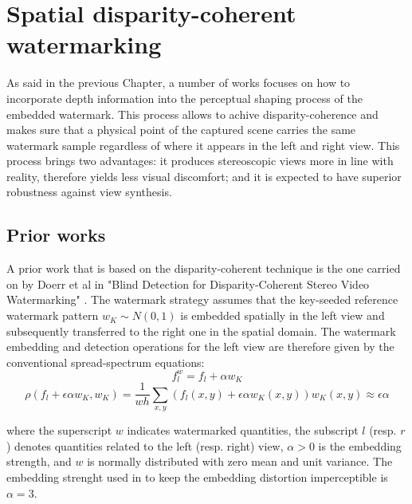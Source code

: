 \chapter{Spatial disparity-coherent watermarking}
\label{spa}



As said in the previous Chapter, a number of works focuses on how to incorporate depth information into the perceptual shaping process of the embedded watermark.\newline 
This process allows to achive disparity-coherence and makes sure that a physical point of the captured scene carries the same watermark sample regardless of where it appears in the left and right view.\newline
This process brings two advantages: it produces stereoscopic views more in line with reality, therefore yields less visual discomfort; and it is expected to have superior robustness against view synthesis.\newline

\section{Prior works} 

A prior work that is based on the disparity-coherent technique is the one carried on by Doerr et al in "Blind Detection for Disparity-Coherent
Stereo Video Watermarking" \cite{DOER2}.\newline
The watermark strategy  assumes that the key-seeded reference watermark pattern $w_{K} \sim N(0, 1)$ is embedded spatially in the left view and subsequently transferred to the right one in the spatial domain.\newline
The watermark embedding and detection operations for the left view are therefore given by the conventional spread-spectrum equations:
\begin{equation}\label{eq:doerl1}
f_{l}^{w} = f_{l}+\alpha w_{K}
\end{equation}
\begin{equation}\label{eq:doerl2}
\rho(f_{l}+\epsilon\alpha w_{K},w_{K})= \frac{1}{wh}\sum_{x,y}(f_{l}(x,y)+\epsilon\alpha w_{K}(x,y))w_{K}(x,y)\approx\epsilon\alpha
\end{equation}

where the superscript $w$ indicates watermarked quantities, the subscript $l$ (resp. $r$ ) denotes quantities related to the left (resp. right) view, $\alpha > 0$ is the embedding strength, and $w$ is normally distributed with zero mean and unit variance.\newline
The embedding strenght used in \cite{DOER2} to keep the embedding distortion imperceptible is $\alpha = 3$.\newline 


